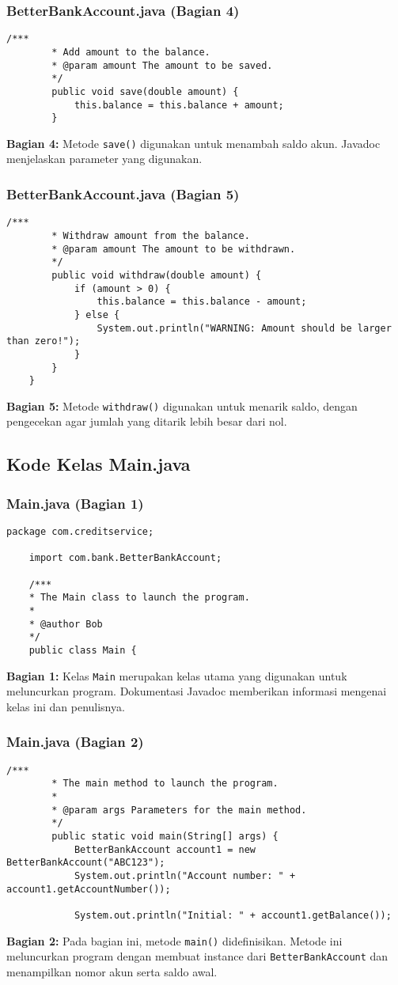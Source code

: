 \documentclass[aspectratio=169, table]{beamer}
\begin{document}
\begin{frame}[fragile]
	\frametitle{BetterBankAccount.java (Bagian 4)}
	\begin{lstlisting}[style=JavaStyle]
		/***
		* Add amount to the balance.  
		* @param amount The amount to be saved.
		*/
		public void save(double amount) {
			this.balance = this.balance + amount;
		}
	\end{lstlisting}
	\textbf{Bagian 4:} Metode \texttt{save()} digunakan untuk menambah saldo akun. Javadoc menjelaskan parameter yang digunakan.
\end{frame}

\begin{frame}[fragile]
	\frametitle{BetterBankAccount.java (Bagian 5)}
	\begin{lstlisting}[style=JavaStyle]
		/***
		* Withdraw amount from the balance.
		* @param amount The amount to be withdrawn.
		*/
		public void withdraw(double amount) {
			if (amount > 0) {
				this.balance = this.balance - amount;
			} else {
				System.out.println("WARNING: Amount should be larger than zero!");
			}
		}
	}
\end{lstlisting}
\textbf{Bagian 5:} Metode \texttt{withdraw()} digunakan untuk menarik saldo, dengan pengecekan agar jumlah yang ditarik lebih besar dari nol.
\end{frame}



\subsection{Kode Kelas Main.java}

\begin{frame}[fragile]
\frametitle{Main.java (Bagian 1)}
\begin{lstlisting}[style=JavaStyle]
	package com.creditservice;
	
	import com.bank.BetterBankAccount;
	
	/***
	* The Main class to launch the program.
	* 
	* @author Bob
	*/
	public class Main {
	\end{lstlisting}
	\textbf{Bagian 1:} Kelas \texttt{Main} merupakan kelas utama yang digunakan untuk meluncurkan program. Dokumentasi Javadoc memberikan informasi mengenai kelas ini dan penulisnya.
\end{frame}

\begin{frame}[fragile]
	\frametitle{Main.java (Bagian 2)}
	\begin{lstlisting}[style=JavaStyle]
		/***
		* The main method to launch the program.
		* 
		* @param args Parameters for the main method.
		*/
		public static void main(String[] args) {
			BetterBankAccount account1 = new BetterBankAccount("ABC123");
			System.out.println("Account number: " + account1.getAccountNumber());
			
			System.out.println("Initial: " + account1.getBalance());
		\end{lstlisting}
		\textbf{Bagian 2:} Pada bagian ini, metode \texttt{main()} didefinisikan. Metode ini meluncurkan program dengan membuat instance dari \texttt{BetterBankAccount} dan menampilkan nomor akun serta saldo awal.
	\end{frame}
	
\end{document}
